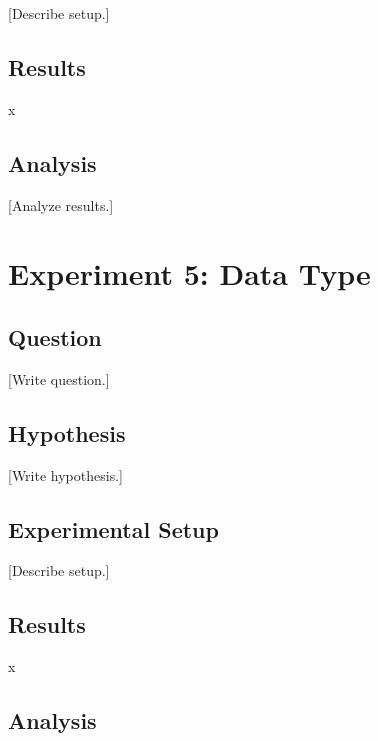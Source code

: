 \documentclass[11pt]{article}
\begin{document}
%

[Describe setup.]

\subsection{Results}
x

\subsection{Analysis}


[Analyze results.]

\section{Experiment 5: Data Type}

\subsection{Question}
[Write question.]

\subsection{Hypothesis}
[Write hypothesis.]

\subsection{Experimental Setup}


[Describe setup.]

\subsection{Results}
x

\subsection{Analysis}
\end{document}
